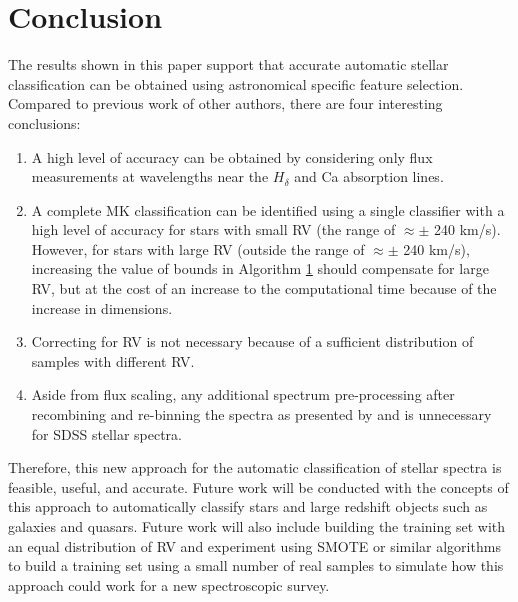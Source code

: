 \documentclass[trackchanges, floatfix, twocolumn, tighten]{aastex62}
\newcommand{\RomanNumeralCaps}[1] {\MakeUppercase{\romannumeral #1}}
\begin{document}
\section{Conclusion}\label{sec:conc}

The results shown in this paper support that accurate automatic stellar classification can be obtained using astronomical specific feature selection. Compared to previous work of other authors, there are four interesting conclusions:

\begin{enumerate}
	\item A high level of accuracy can be obtained by considering only flux measurements at wavelengths near the $H_\delta$ and Ca \RomanNumeralCaps{1} absorption lines.
	\item A complete MK classification can be identified using a single classifier with a high level of accuracy for stars with small RV (the range of $\approx \pm$ 240 km/s). However, for stars with large RV (outside the range of $\approx \pm$ 240 km/s), increasing the value of 			bounds in Algorithm \hyperlink{alg:FS}{1} should compensate for large RV, but at the cost of an increase to the computational time because of the increase in dimensions. 
	\item Correcting for RV is not necessary because of a sufficient distribution of samples with different RV.
	\item Aside from flux scaling, any additional spectrum pre-processing after recombining and re-binning the spectra as presented by \cite{Dawson} and \cite{Stoughton} is unnecessary for SDSS stellar spectra. 

\end{enumerate}

Therefore, this new approach for the automatic classification of stellar spectra is feasible, useful, and accurate. Future work will be conducted with the concepts of this approach to automatically classify stars and large redshift objects such as galaxies and quasars. Future work will also include building the training set with an equal distribution of RV and experiment using SMOTE or similar algorithms to build a training set using a small number of real samples to simulate how this approach could work for a new spectroscopic survey.



\end{document}
